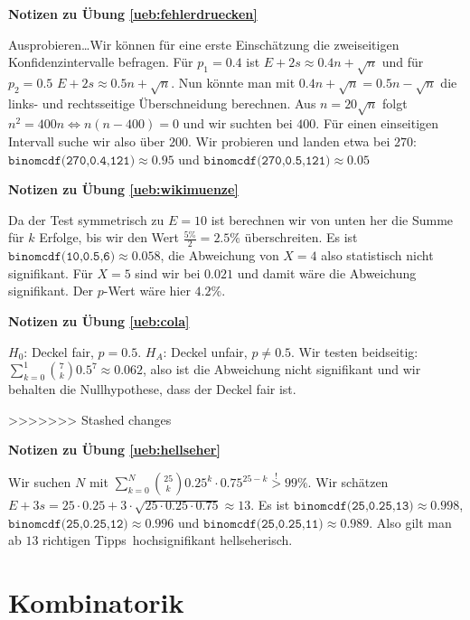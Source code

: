 \documentclass[%
<<<<<<< Updated upstream
<<<<<<< Updated upstream
11pt,%
twoside,%
titlepage,%
german,%
=======
=======
>>>>>>> Stashed changes
11pt,%
twoside,%
titlepage,%
swissgerman,%
<<<<<<< Updated upstream
>>>>>>> Stashed changes
=======
>>>>>>> Stashed changes
headsepline%
]{scrartcl}
\newcommand{\faReturnGray}{\textcolor{gray}{\faMailReply}} %
\theoremstyle{definition}
\theoremstyle{plain}
\newcommand{\concatueb}[1]{ueb:#1}%
\newcommand{\concatlsg}[1]{lsg:#1}%
\newenvironment{lsg}[1]{%
    \par\noindent\textbf{Notizen zu Übung \ref{\concatueb{#1}}}\label{\concatlsg{#1}}
    \hfill\hyperref[\concatueb{#1}]{\faReturnGray}\par %
}{%
    \par%
}
\newcommand{\concatueb}[1]{ueb:#1}%
\newcommand{\concatlsg}[1]{lsg:#1}%
\newenvironment{lsg}[1]{%
    \par\noindent\textbf{Notizen zu Übung \ref{\concatueb{#1}}.}%
    \label{\concatlsg{#1}}
}{%
    \par%
}
\begin{document}
\begin{lsg}{fehlerdruecken}
    Ausprobieren\dots Wir können für eine erste Einschätzung die zweiseitigen Konfidenzintervalle befragen. Für $p_1=0.4$ ist $E+2s\approx0.4n+\sqrt{n}$ und für $p_2=0.5$ $E+2s\approx0.5n+\sqrt{n}$. Nun könnte man mit $0.4n+\sqrt{n}=0.5n-\sqrt{n}$ die links- und rechtsseitige Überschneidung berechnen. Aus $n=20\sqrt{n}$ folgt $n^2=400n\Leftrightarrow n(n-400)=0$ und wir suchten bei $400$. Für einen einseitigen Intervall suche wir also über $200$. Wir probieren und landen etwa bei $270$: $\texttt{binomcdf(270,0.4,121)}\approx0.95$ und $\texttt{binomcdf(270,0.5,121)}\approx0.05$
\end{lsg}

\begin{lsg}{wikimuenze}
    Da der Test symmetrisch zu $E=10$ ist berechnen wir von unten her die Summe für $k$ Erfolge, bis wir den Wert $\frac{5\%}{2}=2.5\%$ überschreiten. Es ist $\texttt{binomcdf(10,0.5,6)}\approx0.058$, die Abweichung von $X=4$ also statistisch nicht signifikant. Für $X=5$ sind wir bei $0.021$ und damit wäre die Abweichung signifikant. Der $p$-Wert wäre hier $4.2\%$.
\end{lsg}

\begin{lsg}{cola}
    $H_0$: Deckel fair, $p=0.5$. $H_A$: Deckel unfair, $p\neq0.5$. Wir testen beidseitig: $\sum_{k=0}^1\binom{7}{k}0.5^7\approx0.062$, also ist die Abweichung nicht signifikant und wir behalten die Nullhypothese, dass der Deckel fair ist.
\end{lsg}

>>>>>>> Stashed changes
\begin{lsg}{hellseher}
    Wir suchen $N$ mit $\sum_{k=0}^N\binom{25}{k}0.25^k\cdot0.75^{25-k}\stackrel{!}{>}99\%$. Wir schätzen $E+3s=25\cdot0.25+3\cdot\sqrt{25\cdot0.25\cdot0.75}\approx13$. Es ist $\texttt{binomcdf(25,0.25,13)}\approx0.998$, $\texttt{binomcdf(25,0.25,12)}\approx0.996$ und $\texttt{binomcdf(25,0.25,11)}\approx0.989$. Also gilt man ab $13$ richtigen \glqq Tipps\grqq\ hochsignifikant hellseherisch.
\end{lsg}

\clearpage

\appendix

\section{Kombinatorik}
\end{document}
